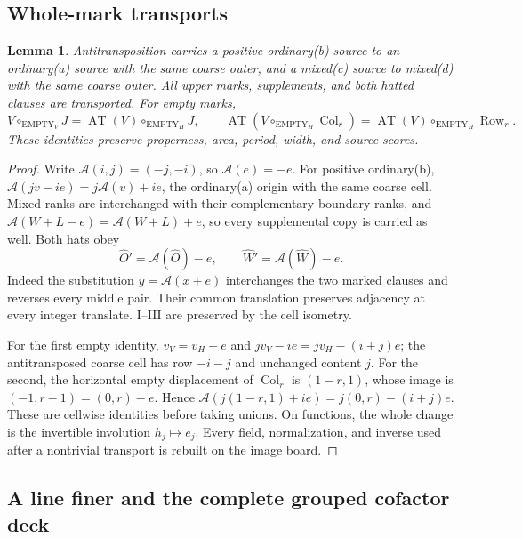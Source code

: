 \documentclass[11pt,a4paper]{amsart}
\numberwithin{equation}{section}
\theoremstyle{plain}
\newtheorem{lemma}[theorem]{Lemma}
\theoremstyle{definition}
\newcommand{\AT}{\operatorname{AT}}
\newcommand{\Row}{\operatorname{Row}}
\newcommand{\Col}{\operatorname{Col}}
\begin{document}
\subsection{Whole-mark transports}
\begin{lemma}\label{rt:transports}
Antitransposition carries a positive ordinary(b) source to an ordinary(a) source with the same coarse outer, and a mixed(c) source to mixed(d) with the same coarse outer.  All upper marks, supplements, and both hatted clauses are transported.  For empty marks,
\begin{equation}\label{rt:empty-transports}
 V\circ_{\mathrm{EMPTY}_V}J=\AT(V)\circ_{\mathrm{EMPTY}_H}J,
 \qquad
 \AT(V\circ_{\mathrm{EMPTY}_H}\Col_r)
   =\AT(V)\circ_{\mathrm{EMPTY}_H}\Row_r.
\end{equation}
These identities preserve properness, area, period, width, and source scores.
\end{lemma}
\begin{proof}
Write \(\mathcal A(i,j)=(-j,-i)\), so \(\mathcal A(e)=-e\).  For positive ordinary(b),
\(\mathcal A(jv-ie)=j\mathcal A(v)+ie\), the ordinary(a) origin with the same coarse cell.  Mixed ranks are interchanged with their complementary boundary ranks, and \(\mathcal A(W+L-e)=\mathcal A(W+L)+e\), so every supplemental copy is carried as well.  Both hats obey
\[
 \widehat O'=\mathcal A(\widehat O)-e,\qquad
 \widehat W'=\mathcal A(\widehat W)-e.
\]
Indeed the substitution \(y=\mathcal A(x+e)\) interchanges the two marked clauses and reverses every middle pair.  Their common translation preserves adjacency at every integer translate.  I--III are preserved by the cell isometry.

For the first empty identity, \(v_V=v_H-e\) and
\(jv_V-ie=jv_H-(i+j)e\); the antitransposed coarse cell has row \(-i-j\) and unchanged content \(j\).  For the second, the horizontal empty displacement of \(\Col_r\) is \((1-r,1)\), whose image is \((-1,r-1)=(0,r)-e\).  Hence
\(\mathcal A(j(1-r,1)+ie)=j(0,r)-(i+j)e\).
These are cellwise identities before taking unions.  On functions, the whole change is the invertible involution \(h_j\mapsto e_j\).  Every field, normalization, and inverse used after a nontrivial transport is rebuilt on the image board.
\end{proof}
\subsection{A line finer and the complete grouped cofactor deck}
\end{document}
